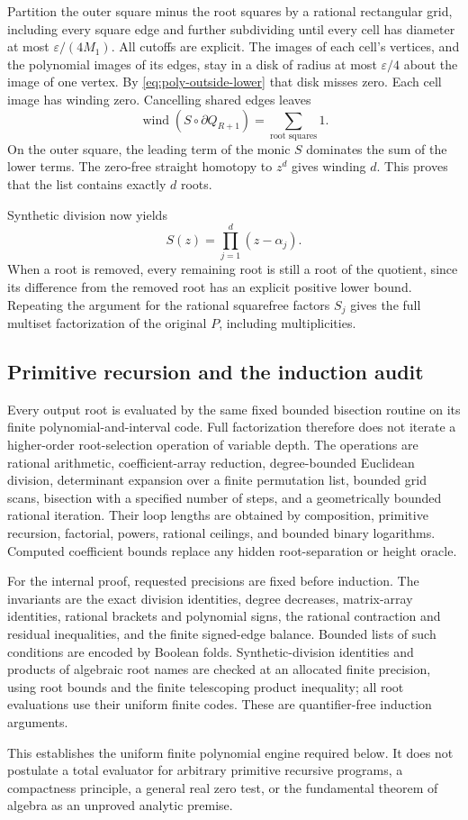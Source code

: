 Partition the outer square minus the root squares by a rational rectangular
grid, including every square edge and further subdividing until every cell
has diameter at most $\varepsilon/(4M_1)$. All cutoffs are explicit. The
images of each cell's vertices, and the polynomial images of its edges,
stay in a disk of radius at most $\varepsilon/4$ about the image of one
vertex. By \eqref{eq:poly-outside-lower} that disk misses zero. Each cell
image has winding zero. Cancelling shared edges leaves
\[
 \operatorname{wind}(S\circ\partial Q_{R+1})
       =\sum_{\text{root squares}}1.
\]
On the outer square, the leading term of the monic $S$ dominates the sum
of the lower terms. The zero-free straight homotopy to $z^d$ gives winding
$d$. This proves that the list contains exactly $d$ roots.

Synthetic division now yields
\[
                             S(z)=\prod_{j=1}^d(z-\alpha_j).
\]
When a root is removed, every remaining root is still a root of the
quotient, since its difference from the removed root has an explicit
positive lower bound. Repeating the argument for the rational squarefree
factors $S_j$ gives the full multiset factorization of the original $P$,
including multiplicities.

\subsection{Primitive recursion and the induction audit}

Every output root is evaluated by the same fixed bounded bisection routine
on its finite polynomial-and-interval code. Full factorization therefore
does not iterate a higher-order root-selection operation of variable depth.
The operations are rational arithmetic, coefficient-array reduction,
degree-bounded Euclidean division, determinant expansion over a finite
permutation list, bounded grid scans, bisection with a specified number of
steps, and a geometrically bounded rational iteration. Their loop lengths
are obtained by composition, primitive recursion, factorial, powers,
rational ceilings, and bounded binary logarithms. Computed coefficient
bounds replace any hidden root-separation or height oracle.

For the internal proof, requested precisions are fixed before induction.
The invariants are the exact division identities, degree decreases,
matrix-array identities, rational brackets and polynomial signs, the
rational contraction and residual inequalities, and the finite signed-edge
balance. Bounded lists of such conditions are encoded by Boolean folds.
Synthetic-division identities and products of algebraic root names are
checked at an allocated finite precision, using root bounds and the finite
telescoping product inequality; all root evaluations use their uniform
finite codes. These are quantifier-free induction arguments.

This establishes the uniform finite polynomial engine required below.
It does not postulate a total evaluator for arbitrary primitive recursive
programs, a compactness principle, a general real zero test, or the
fundamental theorem of algebra as an unproved analytic premise.
